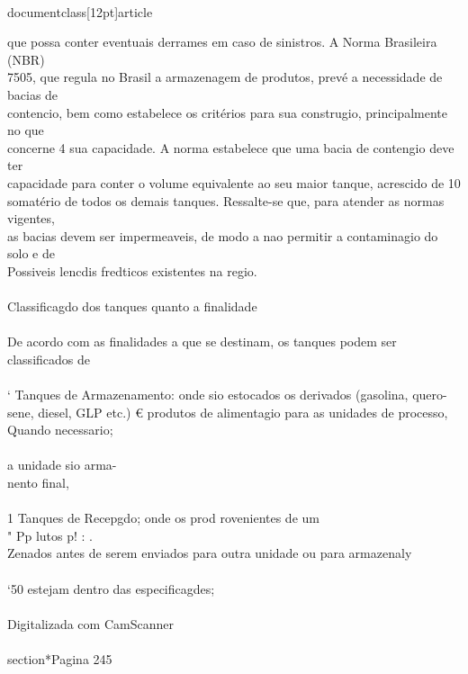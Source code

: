 \\documentclass[12pt]{article}
\begin{document}
que possa conter eventuais derrames em caso de sinistros. A Norma Brasileira (NBR)\\
7505, que regula no Brasil a armazenagem de produtos, prevé a necessidade de bacias de\\
contencio, bem como estabelece os critérios para sua construgio, principalmente no que\\
concerne 4 sua capacidade. A norma estabelece que uma bacia de contengio deve ter\\
capacidade para conter o volume equivalente ao seu maior tanque, acrescido de 10\\%
somatério de todos os demais tanques. Ressalte-se que, para atender as normas vigentes,\\
as bacias devem ser impermeaveis, de modo a nao permitir a contaminagio do solo e de\\
Possiveis lencdis fredticos existentes na regio.\\
\\
Classificagdo dos tanques quanto a finalidade\\
\\
De acordo com as finalidades a que se destinam, os tanques podem ser classificados de\\
\\
‘ Tanques de Armazenamento: onde sio estocados os derivados (gasolina, quero-\\
sene, diesel, GLP etc.) € produtos de alimentagio para as unidades de processo,\\
Quando necessario;\\
\\
a unidade sio arma-\\
nento final,\\
\\
1 Tanques de Recepgdo; onde os prod rovenientes de um\\
" Pp lutos p! : .\\
Zenados antes de serem enviados para outra unidade ou para armazenaly\\
\\
‘50 estejam dentro das especificagdes;\\
\\
Digitalizada com CamScanner\\

\\section*{Pagina 245}
\end{document}

